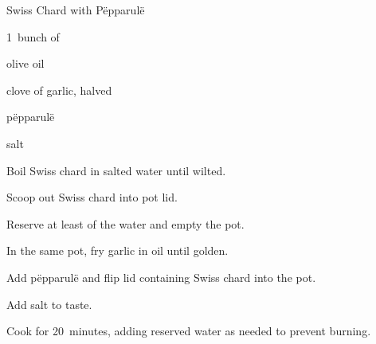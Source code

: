 \begin{recipe}{Swiss Chard with P\"epparul\"e}{}{}

\begin{ingredients}
\item 1~bunch of 
\item olive oil
\item clove of garlic, halved
\item p\"epparul\"e
\item salt
\end{ingredients}

\begin{directions}
\item Boil Swiss chard in salted water until wilted.
\item Scoop out Swiss chard into pot lid.
\item Reserve at least  of the water and empty the pot.
\item In the same pot, fry garlic in oil until golden.
\item Add p\"epparul\"e and flip lid containing Swiss chard into the pot.
\item Add salt to taste.
\item Cook for 20~minutes, adding reserved water as needed to prevent burning.
\end{directions}

\end{recipe}
